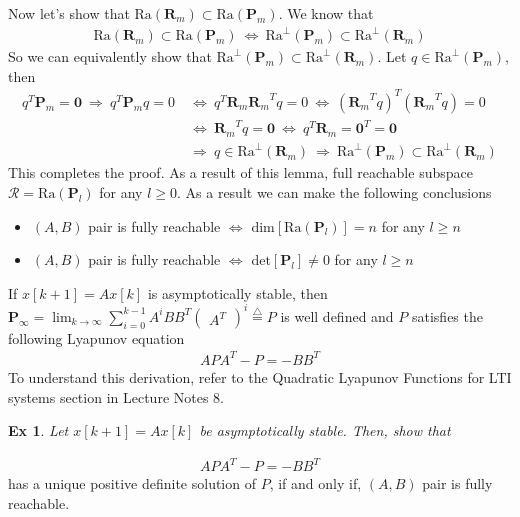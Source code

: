 \documentclass[twoside]{article}
\newtheorem{exmp}[theorem]{Ex}
\begin{document}
Now let's show that $\mathrm{Ra}( \mathbf{R}_m ) \subset \mathrm{Ra}( \mathbf{P}_m )$. We know that
%
\begin{align*}
    \mathrm{Ra}( \mathbf{R}_m ) \subset \mathrm{Ra}( \mathbf{P}_m ) 
    \ \iff \ \mathrm{Ra}^\perp( \mathbf{P}_m ) \subset \mathrm{Ra}^\perp( \mathbf{R}_m )
\end{align*}
%
So we can equivalently show that $\mathrm{Ra}^\perp( \mathbf{P}_m ) \subset \mathrm{Ra}^\perp( \mathbf{R}_m )$.
Let $q \in \mathrm{Ra}^\perp( \mathbf{P}_m )$, then
%
%
\begin{align*}
    q^T \mathbf{P}_m = \mathbf{0} \ \Rightarrow \ q^T \mathbf{P}_m q = 0 \ &\iff \ q^T \mathbf{R}_m {\mathbf{R}_m}^T q = 0
    \ \iff \ ( {\mathbf{R}_m}^T q )^T ( {\mathbf{R}_m}^T q ) = 0
    \\ \ &\iff \ {\mathbf{R}_m}^T q = \mathbf{0} \ \iff \ q^T {\mathbf{R}_m} = \mathbf{0}^T = \mathbf{0}  
    \\ \ &\Rightarrow \ q \in \mathrm{Ra}^\perp( \mathbf{R}_m ) \ \Rightarrow \ \mathrm{Ra}^\perp( \mathbf{P}_m ) \subset \mathrm{Ra}^\perp( \mathbf{R}_m )
\end{align*}
%
This completes the proof. As a result of this lemma, full reachable subspace $\mathcal{R} = \mathrm{Ra}( \mathbf{P}_l )$ for any $l \geq 0$.
As a result we can make the following conclusions 
\begin{itemize}
\item $(A,B)$ pair is fully reachable $\iff$ $\mathrm{dim} \left [\mathrm{Ra}( \mathbf{P}_l ) \right] = n$ for any $l \geq n$
\item $(A,B)$ pair is fully reachable $\iff$ $\mathrm{det} \left [\mathbf{P}_l\right] \neq 0$ for any $l \geq n$
\end{itemize}
% 
If $x[k+1] = A x[k]$ is asymptotically stable, then $\textbf{P}_{\infty} = \lim_{k \to \infty} \sum\limits_{i=0}^{k-1} A^i B B^T \begin{pmatrix} A^T \end{pmatrix}^i \stackrel{\triangle}{=} P$ is well defined and $P$ satisfies the following Lyapunov equation
%
\begin{align*}
 A P A^T - P = -B B^T
\end{align*}
%
To understand this derivation, refer to the Quadratic Lyapunov Functions for LTI systems section in Lecture Notes 8. 
%
\begin{exmp}
 Let $x[k+1] = Ax [k]$ be asymptotically stable. Then, show that  
\end{exmp}
%
\begin{align*}
 A P A^T - P = -B B^T
\end{align*}
%
has a unique positive definite solution of $P$, if and only if, $(A,B)$ pair is fully reachable.
\end{document}
